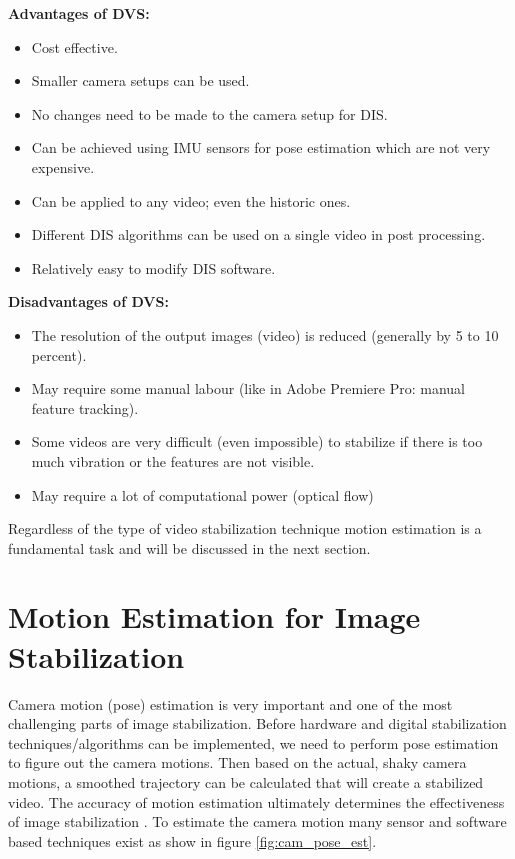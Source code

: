 \textbf{Advantages of DVS: }
\begin{itemize}
\item Cost effective.
\item Smaller camera setups can be used.
\item No changes need to be made to the camera setup for DIS.
\item Can be achieved using IMU sensors for pose estimation which are not very expensive.
\item Can be applied to any video; even the historic ones.
\item Different DIS algorithms can be used on a single video in post processing.
\item Relatively easy to modify DIS software.
\end{itemize}

\textbf{Disadvantages of DVS:}
\begin{itemize}
\item The resolution of the output images (video) is reduced (generally by 5 to 10 percent).
\item May require some manual labour (like in Adobe Premiere Pro: manual feature tracking).
\item Some videos are very difficult (even impossible) to stabilize if there is too much vibration or the features are not visible.
\item May require a lot of computational power (optical flow)
\end{itemize}

Regardless of the type of video stabilization technique motion estimation is a fundamental task and will be discussed in the next section.

\section{Motion Estimation for Image Stabilization}
\label{sec:pose_estimation}
Camera motion (pose) estimation is very important and one of the most challenging parts of image stabilization. Before hardware and digital stabilization techniques/algorithms can be implemented, we need to perform pose estimation to figure out the camera motions. Then based on the actual, shaky camera motions, a smoothed trajectory can be calculated that will create a stabilized video. The accuracy of motion estimation ultimately determines the effectiveness of image stabilization \citep{ryu2012robust}. To estimate the camera motion many sensor and software based techniques exist as show in figure \ref{fig:cam_pose_est}.

